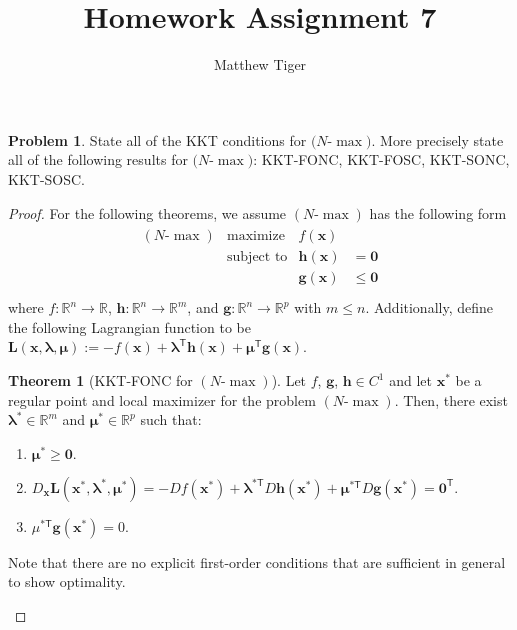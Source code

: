 \documentclass[12pt]{article}
\title{Homework Assignment 7}
\author{Matthew Tiger}
\theoremstyle{definition}
\newtheorem{problem}{Problem}
\newcommand{\vc}[1]{\boldsymbol{#1}}
\newcommand{\tran}{\mathsf{T}}
\newtheorem{theorem}{Theorem}
\begin{document}
\maketitle


\begin{problem}
  State all of the KKT conditions for $(N$-$\max)$. More precisely state all of the following
  results for $(N$-$\max)$: KKT-FONC, KKT-FOSC, KKT-SONC, KKT-SOSC.
\end{problem}

\begin{proof}
  For the following theorems, we assume $(N\text{-}\max)$ has the following form
  \begin{align*}
    \begin{array}{rrll}
      (N\text{-}\max) & \text{maximize} & f(\vc{x}) & \\
      & \text{subject to} & \vc{h}(\vc{x}) &= \vc{0} \\
      & & \vc{g}(\vc{x}) &\leq \vc{0} \\
    \end{array}
  \end{align*}
  where $f:\mathbb{R}^n\to\mathbb{R}$, $\vc{h}:\mathbb{R}^n \to \mathbb{R}^m$, and $\vc{g}:\mathbb{R}^n \to \mathbb{R}^p$ with $m \leq n$.
  Additionally, define the following Lagrangian function to be
  $\vc{L}(\vc{x}, \vc{\lambda}, \vc{\mu}) := -f(\vc{x}) + \vc{\lambda}^\tran\vc{h}(\vc{x}) + \vc{\mu}^\tran\vc{g}(\vc{x})$.

  \begin{theorem}[KKT-FONC for $(N\text{-}\max)$]
    Let $f$, $\vc{g}$, $\vc{h} \in C^1$ and let
    $\vc{x}^*$ be a regular point and local maximizer for the problem $(N\text{-}\max)$. Then,
    there exist $\vc{\lambda}^*\in\mathbb{R}^m$
    and $\vc{\mu}^* \in \mathbb{R}^p$ such that:
    \begin{enumerate}[label=\roman*.]
      \item $\vc{\mu}^* \geq \vc{0}.$
      \item $D_{\vc{x}}\vc{L}(\vc{x}^*, \vc{\lambda}^*, \vc{\mu}^*) = - Df(\vc{x}^*) + \vc{\lambda}^{*\tran}D\vc{h}(\vc{x}^*) + \vc{\mu}^{*\tran}D\vc{g}(\vc{x}^*)= \vc{0}^\tran$.
      \item $\mu^{*\tran}\vc{g}(\vc{x}^*) = 0$.
    \end{enumerate}
  Note that there are no explicit first-order conditions that are sufficient
  in general to show optimality.
  \end{theorem}


\end{proof}
\end{document}

